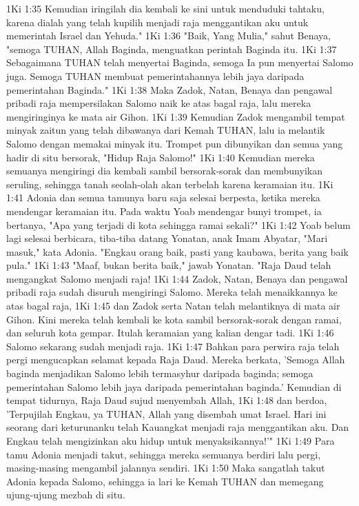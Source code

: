 1Ki 1:35  Kemudian iringilah dia kembali ke sini untuk menduduki tahtaku, karena dialah yang telah kupilih menjadi raja menggantikan aku untuk memerintah Israel dan Yehuda."
1Ki 1:36  "Baik, Yang Mulia," sahut Benaya, "semoga TUHAN, Allah Baginda, menguatkan perintah Baginda itu.
1Ki 1:37  Sebagaimana TUHAN telah menyertai Baginda, semoga Ia pun menyertai Salomo juga. Semoga TUHAN membuat pemerintahannya lebih jaya daripada pemerintahan Baginda."
1Ki 1:38  Maka Zadok, Natan, Benaya dan pengawal pribadi raja mempersilakan Salomo naik ke atas bagal raja, lalu mereka mengiringinya ke mata air Gihon.
1Ki 1:39  Kemudian Zadok mengambil tempat minyak zaitun yang telah dibawanya dari Kemah TUHAN, lalu ia melantik Salomo dengan memakai minyak itu. Trompet pun dibunyikan dan semua yang hadir di situ bersorak, "Hidup Raja Salomo!"
1Ki 1:40  Kemudian mereka semuanya mengiringi dia kembali sambil bersorak-sorak dan membunyikan seruling, sehingga tanah seolah-olah akan terbelah karena keramaian itu.
1Ki 1:41  Adonia dan semua tamunya baru saja selesai berpesta, ketika mereka mendengar keramaian itu. Pada waktu Yoab mendengar bunyi trompet, ia bertanya, "Apa yang terjadi di kota sehingga ramai sekali?"
1Ki 1:42  Yoab belum lagi selesai berbicara, tiba-tiba datang Yonatan, anak Imam Abyatar, "Mari masuk," kata Adonia. "Engkau orang baik, pasti yang kaubawa, berita yang baik pula."
1Ki 1:43  "Maaf, bukan berita baik," jawab Yonatan. "Raja Daud telah mengangkat Salomo menjadi raja!
1Ki 1:44  Zadok, Natan, Benaya dan pengawal pribadi raja sudah disuruh mengiringi Salomo. Mereka telah menaikkannya ke atas bagal raja,
1Ki 1:45  dan Zadok serta Natan telah melantiknya di mata air Gihon. Kini mereka telah kembali ke kota sambil bersorak-sorak dengan ramai, dan seluruh kota gempar. Itulah keramaian yang kalian dengar tadi.
1Ki 1:46  Salomo sekarang sudah menjadi raja.
1Ki 1:47  Bahkan para perwira raja telah pergi mengucapkan selamat kepada Raja Daud. Mereka berkata, 'Semoga Allah baginda menjadikan Salomo lebih termasyhur daripada baginda; semoga pemerintahan Salomo lebih jaya daripada pemerintahan baginda.' Kemudian di tempat tidurnya, Raja Daud sujud menyembah Allah,
1Ki 1:48  dan berdoa, 'Terpujilah Engkau, ya TUHAN, Allah yang disembah umat Israel. Hari ini seorang dari keturunanku telah Kauangkat menjadi raja menggantikan aku. Dan Engkau telah mengizinkan aku hidup untuk menyaksikannya!'"
1Ki 1:49  Para tamu Adonia menjadi takut, sehingga mereka semuanya berdiri lalu pergi, masing-masing mengambil jalannya sendiri.
1Ki 1:50  Maka sangatlah takut Adonia kepada Salomo, sehingga ia lari ke Kemah TUHAN dan memegang ujung-ujung mezbah di situ.
